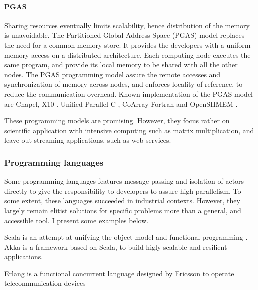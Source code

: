\paragraph{PGAS}

Sharing resources eventually limits scalability, hence distribution of the memory is unavoidable.
The Partitioned Global Address Space (PGAS) model replaces the need for a common memory store.
It provides the developers with a uniform memory access on a distributed architecture.
Each computing node executes the same program, and provide its local memory to be shared with all the other nodes.
The PGAS programming model assure the remote accesses and synchronization of memory across nodes, and enforces locality of reference, to reduce the communication overhead.
Known implementation of the PGAS model are 
Chapel\cite{Chamberlain2007},
X10 \cite{Charles2005}.
Unified Parallel C \cite{El-Ghazawi2006},
CoArray Fortran \cite{Numrich1998} and
OpenSHMEM \cite{Chapman2010}.

These programming models are promising.
However, they focus rather on scientific application with intensive computing such as matrix multiplication, and leave out streaming applications, such as web services.

\subsubsection{Programming languages} \label{chpater3:concurrent-programming:programming-languages}


Some programming languages features message-passing and isolation of actors directly to give the responsibility to developers to assure high parallelism.
To some extent, these languages succeeded in industrial contexts.
However, they largely remain elitist solutions for specific problems more than a general, and accessible tool.
I present some examples below.

Scala is an attempt at unifying the object model and functional programming \cite{Odersky2004}.
Akka is a framework based on Scala, to build higly scalable and resilient applications.

Erlang is a functional concurrent language designed by Ericsson to operate telecommunication devices \cite{JoeArmstrong,Nelson2004} %

